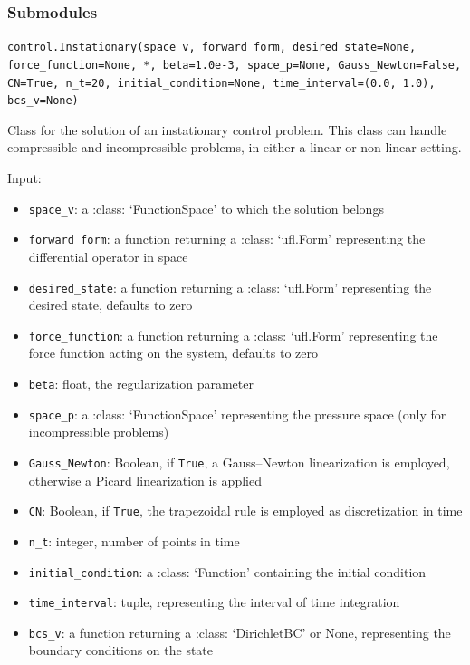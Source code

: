 \documentclass[letterpaper,10pt,english]{sphinxmanual}
\begin{document}
\subsubsection{Submodules}
\texttt{control.Instationary(space{\_}v, forward{\_}form, desired{\_}state=None, force{\_}function=None, *, beta=1.0e-3, space{\_}p=None, Gauss{\_}Newton=False, CN=True, n{\_}t=20, initial{\_}condition=None, time{\_}interval=(0.0, 1.0), bcs{\_}v=None)}

Class for the solution of an instationary control problem. This class can
    handle compressible and incompressible problems, in either a linear or
    non-linear setting.

Input:
\begin{itemize}
\item \texttt{space{\_}v}: a :class: `FunctionSpace' to which the solution belongs

\item \texttt{forward{\_}form}: a function returning a :class: `ufl.Form' representing
        the differential operator in space

\item \texttt{desired{\_}state}: a function returning a :class: `ufl.Form' representing
        the desired state, defaults to zero

\item \texttt{force{\_}function}: a function returning a :class: `ufl.Form' representing
        the force function acting on the system, defaults to zero

\item \texttt{beta}: float, the regularization parameter

\item \texttt{space{\_}p}: a :class: `FunctionSpace' representing the pressure space
        (only for incompressible problems)

\item \texttt{Gauss{\_}Newton}: Boolean, if \texttt{True}, a Gauss--Newton linearization is
        employed, otherwise a Picard linearization is applied

\item \texttt{CN}: Boolean, if \texttt{True}, the trapezoidal rule is employed as
        discretization in time

\item \texttt{n{\_}t}: integer, number of points in time

\item \texttt{initial{\_}condition}: a :class: `Function' containing the initial
        condition

\item \texttt{time{\_}interval}: tuple, representing the interval of time integration

\item \texttt{bcs{\_}v}: a function returning a :class: `DirichletBC' or None,
        representing the boundary conditions on the state
\end{itemize}
\end{document}

